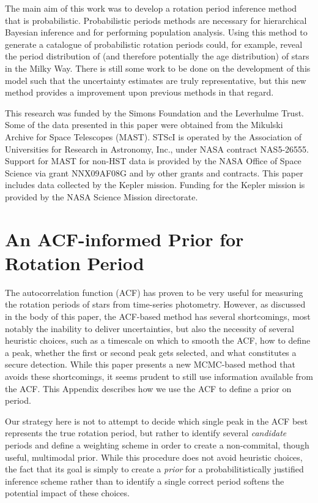 \documentclass[useAMS, usenatbib, preprint, 12pt]{aastex}
\begin{document}
The main aim of this work was to develop a rotation period inference method
that is probabilistic.
Probabilistic periods methods are necessary for hierarchical Bayesian
inference and for performing population analysis.
Using this method to generate a catalogue of probabilistic rotation periods
could, for example, reveal the period distribution of (and therefore
potentially the age distribution) of stars in the Milky Way.
There is still some work to be done on the development of this model such that
the uncertainty estimates are truly representative, but this new method
provides a improvement upon previous methods in that regard.

This research was funded by the Simons Foundation and the Leverhulme Trust.
Some of the data presented in this paper were obtained from the Mikulski
Archive for Space Telescopes (MAST).
STScI is operated by the Association of Universities for Research in
Astronomy, Inc., under NASA contract NAS5-26555.
Support for MAST for non-HST data is provided by the NASA Office of Space
Science via grant NNX09AF08G and by other grants and contracts.
This paper includes data collected by the Kepler mission. Funding for the
Kepler mission is provided by the NASA Science Mission directorate.

\appendix

\section{An ACF-informed Prior for Rotation Period}

The autocorrelation function (ACF) has proven to be very useful
for measuring the rotation periods of stars from time-series
photometry.
However, as discussed in the body of this paper, the
ACF-based method has several shortcomings,
most notably the inability to deliver uncertainties, but also
the necessity of several heuristic choices,
such as a timescale on which to smooth the ACF,
how to define a peak, whether the first or second peak
gets selected, and what constitutes a secure detection.
While this paper presents a new MCMC-based method
that avoids these shortcomings,
it seems prudent to still use information available from the ACF.
This Appendix describes how we use the ACF to define a prior on period.

Our strategy here is not to attempt to decide which single
peak in the ACF best represents the true rotation period,
but rather to identify several \emph{candidate} periods and define
a weighting scheme in order to create a non-commital, though useful,
multimodal prior.  While this procedure does not avoid heuristic choices,
the fact that its goal is simply to create a \emph{prior} for a
probabilitistically justified inference scheme rather than
to identify a single correct period softens the potential impact
of these choices.
\end{document}
